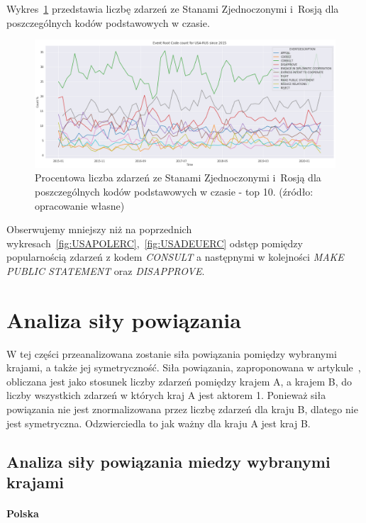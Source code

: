 \documentclass[11pt]{report}
\begin{document}
    Wykres~\ref{fig:USARUSERC} przedstawia liczbę zdarzeń ze Stanami Zjednoczonymi i~Rosją dla poszczególnych kodów podstawowych w czasie.
    \begin{figure}[!htp]
        \centering
        \includegraphics[width=\linewidth]{fig/USA/USARUSERCperc.png}
        \caption{Procentowa liczba zdarzeń ze Stanami Zjednoczonymi i~Rosją dla poszczególnych kodów podstawowych w czasie - top 10. (źródło: opracowanie własne)}
        \label{fig:USARUSERC}
    \end{figure}
    Obserwujemy mniejszy niż na poprzednich wykresach~\ref{fig:USAPOLERC},~\ref{fig:USADEUERC} odstęp pomiędzy popularnością zdarzeń z kodem \textit{CONSULT} a następnymi w kolejności \textit{MAKE PUBLIC STATEMENT} oraz \textit{DISAPPROVE}.


    \section{Analiza siły powiązania}\label{sec:analiza-siły-powiązania}
    W tej części przeanalizowana zostanie siła powiązania pomiędzy wybranymi krajami, a także jej symetryczność.
    Siła powiązania, zaproponowana w artykule~\cite{Yuan2017}, obliczana jest jako stosunek liczby zdarzeń pomiędzy krajem A, a krajem B, do liczby wszystkich zdarzeń w których kraj A jest aktorem 1.
    Ponieważ siła powiązania nie jest znormalizowana przez liczbę zdarzeń dla kraju B, dlatego nie jest symetryczna.
    Odzwierciedla to jak ważny dla kraju A jest kraj B.

    \subsection{Analiza siły powiązania miedzy wybranymi krajami}

    \paragraph{Polska}
\end{document}
